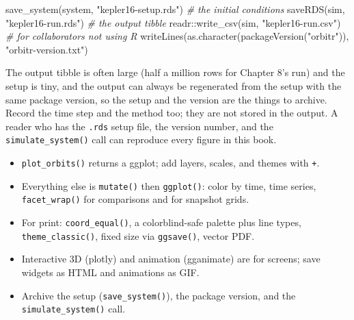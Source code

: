 \documentclass[
  10.5pt,
  letterpaper,
]{scrbook}
\newenvironment{Shaded}{\begin{snugshade}}{\end{snugshade}}
\newcommand{\CommentTok}[1]{\textcolor[rgb]{0.00,0.00,0.00}{\textit{#1}}}
\newcommand{\FunctionTok}[1]{\textcolor[rgb]{0.00,0.00,0.00}{#1}}
\newcommand{\NormalTok}[1]{\textcolor[rgb]{0.00,0.00,0.00}{#1}}
\newcommand{\SpecialCharTok}[1]{\textcolor[rgb]{0.00,0.00,0.00}{#1}}
\newcommand{\StringTok}[1]{\textcolor[rgb]{0.00,0.00,0.00}{#1}}
\providecommand{\tightlist}{%
  \setlength{\itemsep}{0pt}\setlength{\parskip}{0pt}}
\theoremstyle{plain}
\theoremstyle{remark}
\begin{document}
\begin{Shaded}
\begin{Highlighting}[]
\FunctionTok{save\_system}\NormalTok{(system, }\StringTok{"kepler16{-}setup.rds"}\NormalTok{)          }\CommentTok{\# the initial conditions}
\FunctionTok{saveRDS}\NormalTok{(sim, }\StringTok{"kepler16{-}run.rds"}\NormalTok{)                   }\CommentTok{\# the output tibble}
\NormalTok{readr}\SpecialCharTok{::}\FunctionTok{write\_csv}\NormalTok{(sim, }\StringTok{"kepler16{-}run.csv"}\NormalTok{)          }\CommentTok{\# for collaborators not using R}
\FunctionTok{writeLines}\NormalTok{(}\FunctionTok{as.character}\NormalTok{(}\FunctionTok{packageVersion}\NormalTok{(}\StringTok{"orbitr"}\NormalTok{)), }\StringTok{"orbitr{-}version.txt"}\NormalTok{)}
\end{Highlighting}
\end{Shaded}

The output tibble is often large (half a million rows for Chapter 8's
run) and the setup is tiny, and the output can always be regenerated
from the setup with the same package version, so the setup and the
version are the things to archive. Record the time step and the method
too; they are not stored in the output. A reader who has the
\texttt{.rds} setup file, the version number, and the
\texttt{simulate\_system()} call can reproduce every figure in this
book.

\begin{tcolorbox}[enhanced jigsaw, arc=.35mm, bottomrule=.15mm, bottomtitle=1mm, breakable, colback=white, colbacktitle=quarto-callout-tip-color!10!white, colframe=quarto-callout-tip-color-frame, coltitle=black, left=2mm, leftrule=.75mm, opacityback=0, opacitybacktitle=0.6, rightrule=.15mm, title={Key results}, titlerule=0mm, toprule=.15mm, toptitle=1mm]

\begin{itemize}
\tightlist
\item
  \texttt{plot\_orbits()} returns a ggplot; add layers, scales, and
  themes with \texttt{+}.
\item
  Everything else is \texttt{mutate()} then \texttt{ggplot()}: color by
  time, time series, \texttt{facet\_wrap()} for comparisons and for
  snapshot grids.
\item
  For print: \texttt{coord\_equal()}, a colorblind-safe palette plus
  line types, \texttt{theme\_classic()}, fixed size via
  \texttt{ggsave()}, vector PDF.
\item
  Interactive 3D (plotly) and animation (gganimate) are for screens;
  save widgets as HTML and animations as GIF.
\item
  Archive the setup (\texttt{save\_system()}), the package version, and
  the \texttt{simulate\_system()} call.
\end{itemize}

\end{tcolorbox}
\end{document}
